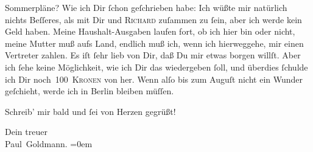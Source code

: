 \pstart
           Sommerpläne? Wie ich Dir{ }ſchon geſchrieben habe: Ich wüßte mir natürlich nichts Beſſeres,
          als mit Dir und \textsc{Richard} zuſammen zu{ }ſein, aber ich werde kein Geld haben. Meine Haushalt-Ausgaben laufen
          fort, ob ich hier bin oder nicht, meine Mutter muß aufs Land, endlich muß ich, wenn ich hierweggehe, mir einen Vertreter zahlen. Es iſt{ }ſehr lieb
          von Dir, daß Du mir etwas borgen willſt. Aber ich{ }ſehe keine Möglichkeit, wie ich Dir das
          wiedergeben{ }ſoll, und überdies{ }ſchulde ich Dir noch 100 \textsc{Kronen}
          von \label{K_L02917-5v}\label{K_L02917-5} her. Wenn alſo bis
          zum Auguſt nicht ein Wunder geſchieht, werde ich in Berlin bleiben müſſen.\pend
           
\pstart
           Schreib’ mir bald und{ }ſei von Herzen gegrüßt!\pend
           
\pstart
           Dein treuer {\\[\baselineskip]}\spacefill\mbox{Paul Goldmann.}\pend
           \leftskip=0em{}\endnumbering{}  \newcommand{\dateiname}{L02917}\newcommand{\titel}{Paul Goldmann an Arthur Schnitzler, 29. 5. [1900]}\newcommand{\editorInnen}{Martin Anton Müller und Laura Untner}
